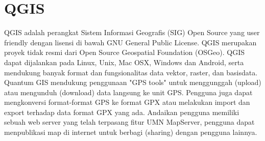 \section{QGIS}
QGIS adalah perangkat Sistem Informasi Geografis (SIG) Open Source yang user friendly dengan lisensi di bawah GNU General Public License. QGIS merupakan proyek tidak resmi dari Open Source Geospatial Foundation (OSGeo). QGIS dapat dijalankan pada Linux, Unix, Mac OSX, Windows dan Android, serta mendukung banyak format dan fungsionalitas data vektor, raster, dan basisdata.
Quantum GIS mendukung penggunaan "GPS tools" untuk menggunggah (upload) atau mengunduh (download) data langsung ke unit GPS. Pengguna juga dapat mengkonversi format-format GPS ke format GPX atau melakukan import dan export terhadap data format GPX yang ada.
Andaikan pengguna memiliki sebuah web server yang telah terpasang fitur UMN MapServer, pengguna dapat menpublikasi map di internet untuk berbagi (sharing) dengan pengguna lainnya.

